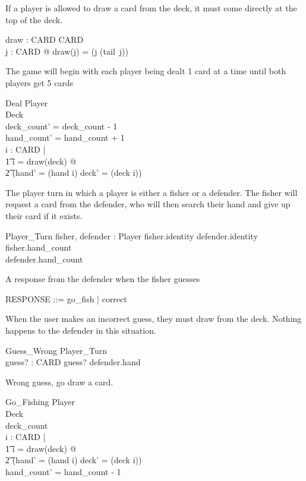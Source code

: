 If a player is allowed to draw a card from the deck, it must come
directly at the top of the deck.
\begin{axdef}
    draw : \power CARD \fun \power CARD\\
    \where
    \forall j : \power CARD @ draw(j) = (j \setminus (tail~j))
\end{axdef}

The game will begin with each player being dealt 1 card at a time
until both players get 5 cards
\begin{schema}{Deal}
    \Delta Player \\
    \Delta Deck \\
    \where
    deck\_count' = deck\_count - 1\\  
    hand\_count' = hand\_count + 1\\
    \forall i : \power CARD | \\
    \t1 i = draw(deck) @ \\
    \t2 (hand' = (hand \cup i) \land deck' = (deck \setminus i))
\end{schema}

The player turn in which a player is either a fisher
or a defender. The fisher will request a card from the defender,
who will then search their hand and give up their card if it exists.
\begin{schema}{Player\_Turn}
    fisher, defender : Player
    \where
    fisher.identity \neq defender.identity\\
    fisher.hand\_count \\
    defender.hand\_count 
\end{schema}

A response from the defender when the fisher guesses
\begin{zed}
RESPONSE ::= go\_fish | correct
\end{zed}

When the user makes an incorrect guess, they must draw from
the deck. Nothing happens to the defender in this situation.
\begin{schema}{Guess\_Wrong}
    \Xi Player\_Turn \\
    guess? : CARD 
    \where
    guess? \notin defender.hand \\
\end{schema}

Wrong guess, go draw a card.
\begin{schema}{Go\_Fishing}
    \Delta Player\\
    \Delta Deck \\
    \where
    deck\_count  \\
    \forall i : \power CARD | \\
    \t1 i = draw(deck) @ \\
    \t2 (hand' = (hand \cup i) \land deck' = (deck \setminus i)) \\
    hand\_count' = hand\_count - 1 \\
\end{schema}
 
